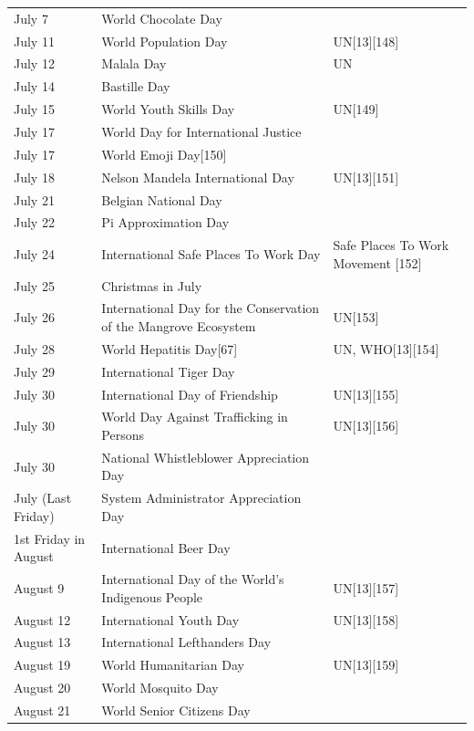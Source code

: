 \documentclass[
  openany]{book}
\begin{document}
\begin{longtable}[t]{>{\raggedright\arraybackslash}p{8em}>{\raggedright\arraybackslash}p{20em}>{\raggedright\arraybackslash}p{12em}}
\rowcolor{gray!6}  July 7 & World Chocolate Day & \\
July 11 & World Population Day & UN[13][148]\\
\rowcolor{gray!6}  July 12 & Malala Day & UN\\
July 14 & Bastille Day & \\
\addlinespace
\rowcolor{gray!6}  July 15 & World Youth Skills Day & UN[149]\\
July 17 & World Day for International Justice & \\
\rowcolor{gray!6}  July 17 & World Emoji Day[150] & \\
July 18 & Nelson Mandela International Day & UN[13][151]\\
\rowcolor{gray!6}  July 21 & Belgian National Day & \\
\addlinespace
July 22 & Pi Approximation Day & \\
\rowcolor{gray!6}  July 24 & International Safe Places To Work Day & Safe Places To Work Movement [152]\\
July 25 & Christmas in July & \\
\rowcolor{gray!6}  July 26 & International Day for the Conservation of the Mangrove Ecosystem & UN[153]\\
July 28 & World Hepatitis Day[67] & UN, WHO[13][154]\\
\addlinespace
\rowcolor{gray!6}  July 29 & International Tiger Day & \\
July 30 & International Day of Friendship & UN[13][155]\\
\rowcolor{gray!6}  July 30 & World Day Against Trafficking in Persons & UN[13][156]\\
July 30 & National Whistleblower Appreciation Day & \\
\rowcolor{gray!6}  July (Last Friday) & System Administrator Appreciation Day & \\
\addlinespace
1st Friday in August & International Beer Day & \\
\rowcolor{gray!6}  August 9 & International Day of the World's Indigenous People & UN[13][157]\\
August 12 & International Youth Day & UN[13][158]\\
\rowcolor{gray!6}  August 13 & International Lefthanders Day & \\
August 19 & World Humanitarian Day & UN[13][159]\\
\addlinespace
\rowcolor{gray!6}  August 20 & World Mosquito Day & \\
August 21 & World Senior Citizens Day & \\

\end{longtable}
\end{document}
